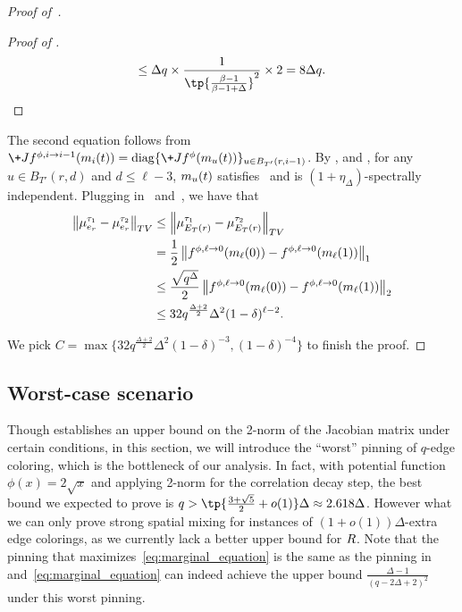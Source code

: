 \documentclass[a4paper,11pt]{article}
\renewcommand{\norm}[1]{\left\|#1\right\|}
\begin{document}
\begin{proof}[Proof of~]
\begin{proof}[Proof of ]
\[        \leq \Delta q\times \frac{1}{\tp{\frac{\beta -1}{\beta -1 + \Delta}}^2}\times 2
        = 8 \Delta q.
        \qedhere
    \]
\end{proof}
The second equation follows from $\+J f^{\phi,i\ra i-1}(\*m_i(t)) = \operatorname{diag}\{\+J f^{\phi}(\*m_u(t))\}_{u\in B_{T'}(r,i-1)}$.
By ,  and , for any $u\in B_{T'}(r,d)$ and $d\leq \ell-3$, $\*m_u(t)$ satisfies~ and is $(1+\eta_\Delta)$-spectrally independent.
Plugging in~ and~, we have that 
\begin{align*}
     \norm{\mu_{e_r}^{\tau_1}- \mu_{e_r}^{\tau_2}}_{\-{TV}}
    &\leq \norm{\mu_{E_T(r)}^{\tau_1}- \mu_{E_T(r)}^{\tau_2}}_{\-{TV}}
    \\&= \frac 12\norm{f^{\phi,\ell\ra 0}(\*m_\ell(0)) - f^{\phi,\ell\ra 0}(\*m_\ell(1))}_1
    \\&\leq \frac{\sqrt{q^\Delta}}2\norm{f^{\phi,\ell\ra 0}(\*m_\ell(0)) - f^{\phi,\ell\ra 0}(\*m_\ell(1))}_2
    \\&\leq 32q^{\frac{\Delta + 2}2}\Delta^2(1-\delta)^{\ell-2}.
\end{align*}

We pick $C = \max\{32q^{\frac{\Delta + 2}2}\Delta^2(1-\delta)^{-3},(1-\delta)^{-4}\}$ to finish the proof.
\end{proof}

\subsection{Worst-case scenario}\label{sec:limit}

Though  establishes an upper bound on the 2-norm of the Jacobian matrix under certain conditions, in this section, we will introduce the ``worst'' pinning of $q$-edge coloring, which is the bottleneck of our analysis. 
In fact, with potential function $\phi(x) = 2\sqrt x$ and applying 2-norm for the correlation decay step, the best bound we expected to prove is $q > \tp{\frac{3+\sqrt 5}{2}+ o(1)}\Delta\approx 2.618\Delta$. However what we can only prove strong spatial mixing for instances of $(1+o(1))\Delta$-extra edge colorings, as we currently lack a better upper bound for $\*R$.
Note that the pinning that maximizes~\cref{eq:marginal_equation} is the same as the pinning in~ and~\cref{eq:marginal_equation} can indeed achieve the upper bound $\frac{\Delta-1}{(q-2\Delta+2)^2}$ under this worst pinning.
\end{document}
